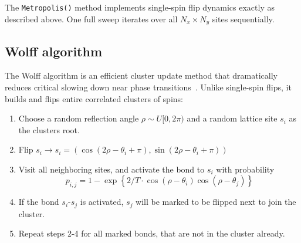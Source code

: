 The \texttt{Metropolis()} method implements single-spin flip dynamics exactly as described above.
One full sweep iterates over all $N_x \times N_y$ sites sequentially.

\subsection{Wolff algorithm}
The Wolff algorithm is an efficient cluster update method that dramatically reduces critical slowing down near phase transitions~\cite{Wolff1989}.
Unlike single-spin flips, it builds and flips entire correlated clusters of spins:
\begin{enumerate}
  \item Choose a random reflection angle $\rho \sim U[0, 2\pi)$ and a random lattice site $s_i$ as the clusters root.
  \item Flip $s_i \rightarrow s_i = (\cos(2\rho - \theta_i + \pi), \sin(2\rho - \theta_i + \pi))$
  \item Visit all neighboring sites, and activate the bond to $s_i$ with probability
  $$
    p_{i,j} = 1 - \exp \left\{2/T \cdot \cos(\rho - \theta_i)\cos(\rho - \theta_j)\right\} 
  $$
  \item If the bond $s_i$-$s_j$ is activated, $s_j$ will be marked to be flipped next to join the cluster.
  \item Repeat steps 2-4 for all marked bonds, that are not in the cluster already.
\end{enumerate}

